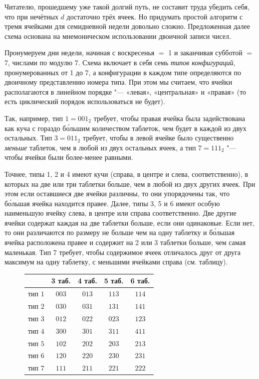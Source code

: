\documentclass[twoside]{book}
\begin{document}
Читателю, прошедшему уже такой долгий путь, не составит труда убедить себя, что при нечётных $d$ достаточно трёх ячеек.
Но придумать простой алгоритм с тремя ячейками для семидневной недели довольно сложно.
Предложенная далее схема основана на мнемоническом использовании двоичной записи чисел.

Пронумеруем дни недели, начиная с воскресенья $=$ 1 и заканчивая субботой $=$ 7, числами по модулю 7.
Схема включает в себя семь \emph{типов конфигураций}, пронумерованных от 1 до 7, а конфигурации в каждом типе определяются по двоичному представлению номера типа.
При этом мы считаем, что ячейки располагаются в линейном порядке "--- «левая», «центральная» и «правая» (то есть циклический порядок использоваться не будет).

Так, например, тип $1=001_2$ требует, чтобы правая ячейка была задействована как куча с гораздо б\'{о}льшим количеством таблеток, чем будет в каждой из двух остальных.
Тип $3 = 011_2$ требует, чтобы в левой ячейке было существенно \emph{меньше} таблеток, чем в любой из двух остальных ячеек,
а тип 7$ = 111_2$ "--- чтобы ячейки были более-менее равными.

Точнее, типы 1, 2 и 4 имеют кучи (справа, в центре и слева, соответственно), в которых на две или три таблетки больше, чем в любой из двух других ячеек.
При этом если оставшиеся две ячейки различны, то они упорядочены так, что б\'{о}льшая ячейка находится правее.
%
Далее, типы 3, 5 и 6 имеют особую наименьшую ячейку слева, в центре или справа соответственно.
Две другие ячейки содержат каждая на две таблетки больше, если они одинаковые.
Если нет, то они различаются по размеру не больше чем на одну таблетку и б\'{о}льшая ячейка расположена правее и содержит на 2 или 3 таблетки больше, чем самая маленькая.
%
Тип 7 требует, чтобы содержимое ячеек отличалось друг от друга максимум на одну таблетку, с меньшими ячейками справа (см. таблицу).

\begin{figure}[!ht]
\vspace{2\jot}
\centering
\begin{tabular}{ l  c c c c }
\toprule
     & 3 таб. & 4 таб. & 5 таб. & 6 таб. \\ \midrule
    тип $1$ & $003$ & $013$ & $113$ & $114$ \\ 
    тип $2$ & $030$ & $031$ & $131$ & $141$ \\ 
    тип $3$ & $012$ & $022$ & $023$ & $123$\\ 
    тип $4$ & $300$ & $301$ & $311$ & $411$\\ 
    тип $5$ & $102$ & $202$ & $203$ & $213$\\ 
    тип $6$ & $120$ & $220$ & $230$ & $231$\\ 
  тип $7$ & $111$ & $211$ & $221$ & $222$ \\
                            \bottomrule
\end{tabular}

\end{figure}
\end{document}
